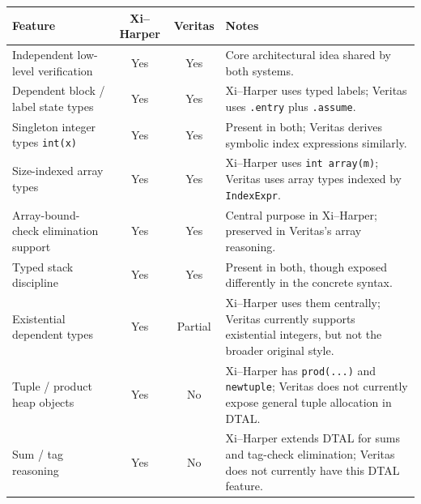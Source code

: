 \begin{table}[H]
  \centering
  \footnotesize
  \setlength{\tabcolsep}{3.6pt}
  \renewcommand{\arraystretch}{0.98}
  \begin{tabular}{p{} c c p{}}
    \hline
    \textbf{Feature}                           & \textbf{Xi--Harper} & \textbf{Veritas} & \textbf{Notes}                                                                                                               \\
    \hline
    Independent low-level verification         & Yes                 & Yes              & Core architectural idea shared by both systems.                                                                              \\
    Dependent block / label state types        & Yes                 & Yes              & Xi--Harper uses typed labels; Veritas uses \texttt{.entry} plus \texttt{.assume}.                                            \\
    Singleton integer types \texttt{int(x)}    & Yes                 & Yes              & Present in both; Veritas derives symbolic index expressions similarly.                                                       \\
    Size-indexed array types                   & Yes                 & Yes              & Xi--Harper uses \texttt{int array(m)}; Veritas uses array types indexed by \texttt{IndexExpr}.                               \\
    Array-bound-check elimination support      & Yes                 & Yes              & Central purpose in Xi--Harper; preserved in Veritas's array reasoning.                                                       \\
    Typed stack discipline                     & Yes                 & Yes              & Present in both, though exposed differently in the concrete syntax.                                                          \\
    Existential dependent types                & Yes                 & Partial          & Xi--Harper uses them centrally; Veritas currently supports existential integers, but not the broader original style.         \\
    Tuple / product heap objects               & Yes                 & No               & Xi--Harper has \texttt{prod(...)} and \texttt{newtuple}; Veritas does not currently expose general tuple allocation in DTAL. \\
    Sum / tag reasoning                        & Yes                 & No               & Xi--Harper extends DTAL for sums and tag-check elimination; Veritas does not currently have this DTAL feature.               \\

\end{tabular}
\end{table}

